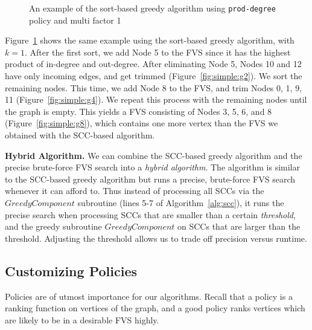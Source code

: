 \begin{figure}[t]
\begin{minipage}[b]{0.19\linewidth}
	\end{minipage}
	\vspace{-1em}             
	\caption{An example of the sort-based greedy algorithm using \texttt{prod-degree} policy and multi factor 1}
	\label{fig:simple}               
	\vspace{-1em}    	
\end{figure}

Figure~\ref{fig:simple} shows the same example using the sort-based greedy algorithm, with $k = 1$. After the first sort, we add Node 5 to the FVS since it has the highest product of in-degree and out-degree. After eliminating Node 5, Nodes 10 and 12 have only incoming edges, and get trimmed (Figure~\ref{fig:simple:g2}). We sort the remaining nodes. This time, we add Node 8 to the FVS, and trim Nodes 0, 1, 9, 11 (Figure~\ref{fig:simple:g4}). We repeat this process with the remaining nodes until the graph is empty. This yields a FVS consisting of Nodes 3, 5, 6, and 8 (Figure~\ref{fig:simple:g8}), which contains one more vertex than the FVS we obtained with the SCC-based algorithm.

{\bf Hybrid Algorithm.}
We can combine the SCC-based greedy algorithm and the precise brute-force FVS search into a \emph{hybrid algorithm}. The algorithm is similar to the SCC-based greedy algorithm but runs a precise, brute-force FVS search whenever it can afford to. Thus instead of processing all SCCs via the $GreedyComponent$ subroutine (lines 5-7 of Algorithm~\ref{alg:scc}), it runs the precise search when processing SCCs that are smaller than a certain \emph{threshold}, and the greedy subroutine $GreedyComponent$ on SCCs that are larger than the threshold. Adjusting the threshold allows us to trade off precision versus runtime.

\subsection{Customizing Policies}
\label{subsec:validator_reordering:policy}
Policies are of utmost importance for our algorithms. Recall that a policy is a ranking function on vertices of the graph, and a good policy ranks vertices which are likely to be in a desirable FVS highly. 

